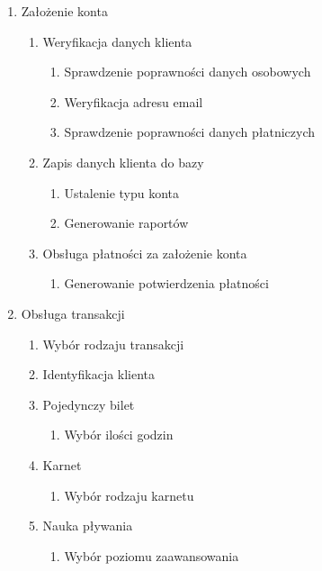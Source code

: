 \documentclass[a4paper,11pt]{article}
\begin{document}
\begin{enumerate}
    \item Założenie konta
        \begin{enumerate}
            \item Weryfikacja danych klienta
                \begin{enumerate}
                    \item Sprawdzenie poprawności danych osobowych
                    \item Weryfikacja adresu email
                    \item Sprawdzenie poprawności danych płatniczych
                \end{enumerate}
            \item Zapis danych klienta do bazy
                \begin{enumerate}
                    \item Ustalenie typu konta
                    \item Generowanie raportów
                \end{enumerate}
            \item Obsługa płatności za założenie konta
                \begin{enumerate}
                    \item Generowanie potwierdzenia płatności
                \end{enumerate}
        \end{enumerate}
    \item Obsługa transakcji
        \begin{enumerate}
            \item Wybór rodzaju transakcji
            \item Identyfikacja klienta
            \item Pojedynczy bilet
                \begin{enumerate}
                    \item Wybór ilości godzin
                \end{enumerate}
            \item Karnet
                \begin{enumerate}
                    \item Wybór rodzaju karnetu
                \end{enumerate}
            \item Nauka pływania
                \begin{enumerate}
                    \item Wybór poziomu zaawansowania

\end{enumerate}
\end{enumerate}
\end{enumerate}
\end{document}
